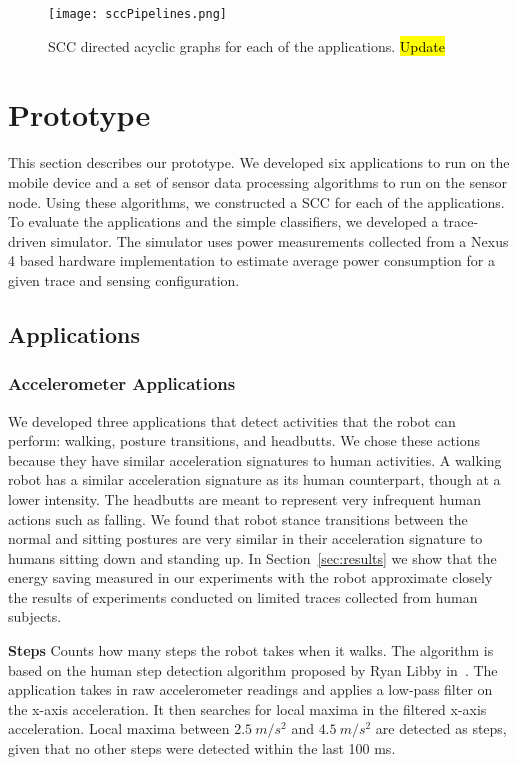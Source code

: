 
\begin{figure*}[t]
	\texttt{[image: sccPipelines.png]}
	\caption{SCC directed acyclic graphs for each of the applications. \hl{Update}}
	\label{fig:sccPipelines}
\end{figure*}

\section{Prototype}
\label{sec:prototype}

This section describes our prototype.  We developed six
applications to run on the mobile device and a set of 
sensor data processing algorithms to run on the sensor
node.  Using these algorithms, we constructed a SCC for
each of the applications.  To evaluate the applications 
and the simple classifiers, we developed a trace-driven
simulator.  The simulator uses power measurements 
collected from a Nexus 4 based hardware implementation
to estimate average power consumption for a given trace
and sensing configuration.

\subsection{Applications}

\subsubsection{Accelerometer Applications}

We developed three applications that detect activities that the robot
can perform: walking, posture transitions, and headbutts.  
We chose these
actions because they have similar acceleration signatures to human
activities.  A walking robot has a similar acceleration signature as
its human counterpart, though at a lower intensity.  The headbutts are
meant to represent very infrequent human actions such as falling.  We
found that robot stance transitions between the normal and sitting
postures are very similar in their acceleration signature to humans
sitting down and standing up.  In Section~\ref{sec:results} we show
that the energy saving measured in our experiments with the robot
approximate closely the results of experiments conducted on limited
traces collected from human subjects.

{\bf Steps} Counts how many steps the robot takes when it
  walks. The algorithm is based on the human step detection algorithm
  proposed by Ryan Libby in~\cite{libbyFootstepDetection}. The
  application takes in raw accelerometer readings and applies a
  low-pass filter on the x-axis acceleration. It then searches for
  local maxima in the filtered x-axis acceleration. Local maxima
  between $2.5\:m/s^2$ and $4.5\:m/s^2$ are detected as steps, given
  that no other steps were detected within the last 100 ms.

